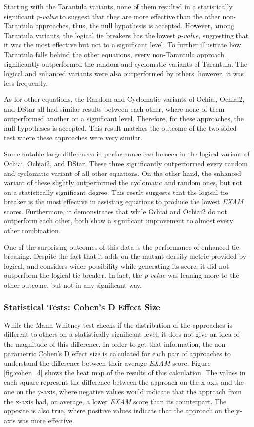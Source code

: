 Starting with the Tarantula variants, none of them resulted in a statistically
significant \emph{p-value} to suggest that they are more effective than the
other non-Tarantula approaches, thus, the null hypothesis is accepted. However,
among Tarantula variants, the logical tie breakers has the lowest \emph{p-value},
suggesting that it was the most effective but not to a significant level.
To further illustrate how Tarantula falls behind the other equations, every
non-Tarantula approach significantly outperformed the random and cyclomatic
variants of Tarantula. The logical and enhanced variants were also outperformed
by others, however, it was less frequently.

As for other equations, the Random and Cyclomatic variants of Ochiai, Ochiai2,
and DStar all had similar results between each other, where none of them
outperformed another on a significant level. Therefore, for these approaches,
the null hypotheses is accepted. This result matches the outcome of the
two-sided test where these approaches were very similar.

Some notable large differences in performance can be seen in the logical variant
of Ochiai, Ochiai2, and DStar. These three significantly outperformed every
random and cyclomatic variant of all other equations. On the other hand, the
enhanced variant of these slightly outperformed the cyclomatic and random ones,
but not on a statistically significant degree. This result suggests that the
logical tie breaker is the most effective in assisting equations to produce the
lowest \emph{EXAM} scores. Furthermore, it demonstrates that while Ochiai and
Ochiai2 do not outperform each other, both show a significant improvement to
almost every other combination.

One of the surprising outcomes of this data is the performance of enhanced tie
breaking. Despite the fact that it adds on the mutant density metric provided by
logical, and considers wider possibility while generating its score, it did not
outperform the logical tie breaker. In fact, the \emph{p-value} was leaning more
to the other outcome, but not in any significant way.

\subsubsection{Statistical Tests: Cohen's D Effect Size}
\label{subsubsec:statistical_test_cohen}

While the Mann-Whitney test checks if the distribution of the approaches is
different to others on a statistically significant level, it does not give an
idea of the magnitude of this difference. In order to get that information, the
non-parametric Cohen's D effect size is calculated for each pair of approaches
to understand the difference between their average \emph{EXAM} score. Figure
\ref{fig:cohen_d} shows the heat map of the results of this calculation. The
values in each square represent the difference between the approach on the
x-axis and the one on the y-axis, where negative values would indicate that the
approach from the x-axis had, on average, a lower \emph{EXAM} score than its
counterpart. The opposite is also true, where positive values indicate that the
approach on the y-axis was more effective.

